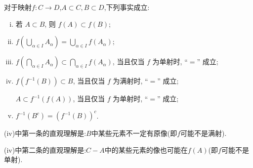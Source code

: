 \documentclass[../../main.tex]{subfiles}
\begin{document}
\begin{proposition}[映射的基本性质]\label{proposition:映射的基本性质}
对于映射$f : C \to D$,$A\subset C,B\subset D$,下列事实成立:
\begin{enumerate}[(i)]
\item 若 $A \subset B$, 则 $f(A) \subset f(B)$;

\item $f\left(\bigcup_{\alpha \in I} A_{\alpha}\right) = \bigcup_{\alpha \in I} f(A_{\alpha})$;

\item $f\left(\bigcap_{\alpha \in I} A_{\alpha}\right) \subset \bigcap_{\alpha \in I} f(A_{\alpha})$, 当且仅当 $f$ 为单射时, “$=$” 成立;

\item $f\left(f^{-1}(B)\right) \subset B$, 当且仅当 $f$ 为满射时, “$=$” 成立;

$A \subset f^{-1}(f(A))$, 当且仅当 $f$ 为单射时, “$=$” 成立;

\item $f^{-1}(B^c) = \left(f^{-1}(B)\right)^c$.
\end{enumerate}
\end{proposition}
\begin{note}
(iv)中第一条的直观理解是:$B$中某些元素不一定有原像(即$f$可能不是满射).

(iv)中第二条的直观理解是:$C-A$中的某些元素的像也可能在$f(A)$(即$f$可能不是单射).
\end{note}
\end{document}
